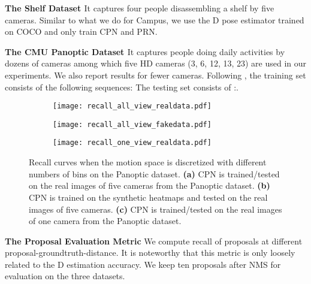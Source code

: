 \documentclass[runningheads]{llncs}
\begin{document}
\noindent
\textbf{The Shelf Dataset \cite{belagiannis20143d}}
It captures four people disassembling a shelf by five cameras. Similar to what we do for Campus, we use the D pose estimator trained on COCO and only train CPN and PRN.

\noindent
\textbf{The CMU Panoptic Dataset \cite{Joo_2017_TPAMI}
}
It captures people doing daily activities by dozens of cameras among which five HD cameras (3, 6, 12, 13, 23) are used in our experiments. We also report results for fewer cameras. Following \cite{xiang2019monocular}, the training set consists of the following sequences:  The testing set consists of :.

\begin{figure}[ht]
\centering
\begin{subfigure}{.29\textwidth}
  \centering
  \texttt{[image: recall\_all\_view\_realdata.pdf]}  
  \caption{}
  \label{fig:sub-first}
\end{subfigure}
\begin{subfigure}{.29\textwidth}
  \centering
  \texttt{[image: recall\_all\_view\_fakedata.pdf]}  
  \caption{}
  \label{fig:sub-second}
\end{subfigure}
\begin{subfigure}{.29\textwidth}
  \centering
  \texttt{[image: recall\_one\_view\_realdata.pdf]}  
  \caption{}
  \label{fig:sub-third}
\end{subfigure}
\caption{Recall curves when the motion space is discretized with different numbers of bins on the Panoptic dataset. \textbf{(a)} CPN is trained/tested on the real images of five cameras from the Panoptic dataset. \textbf{(b)} CPN is trained on the synthetic heatmaps and tested on the real images of five cameras. \textbf{(c)} CPN is trained/tested on the real images of one camera from the Panoptic dataset.}
\label{fig:recall}
\end{figure}

\noindent
\textbf{The Proposal Evaluation Metric}
We compute recall of proposals at different proposal-groundtruth-distance. It is noteworthy that this metric is only loosely related to the D estimation accuracy. We keep ten proposals after NMS for evaluation on the three datasets.
\end{document}
